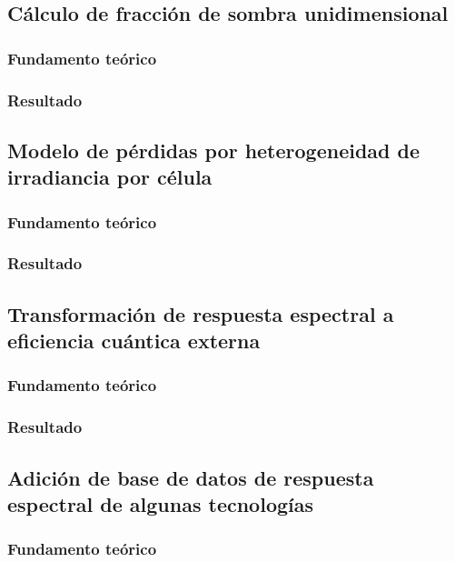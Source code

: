 \subsection{Cálculo de fracción de sombra unidimensional}

\subsubsection{Fundamento teórico}

\subsubsection{Resultado}

\subsection{Modelo de pérdidas por heterogeneidad de irradiancia por célula}

\subsubsection{Fundamento teórico}

\subsubsection{Resultado}

\subsection{Transformación de respuesta espectral a eficiencia cuántica externa}

\subsubsection{Fundamento teórico}

\subsubsection{Resultado}

\subsection{Adición de base de datos de respuesta espectral de algunas tecnologías}

\subsubsection{Fundamento teórico}

